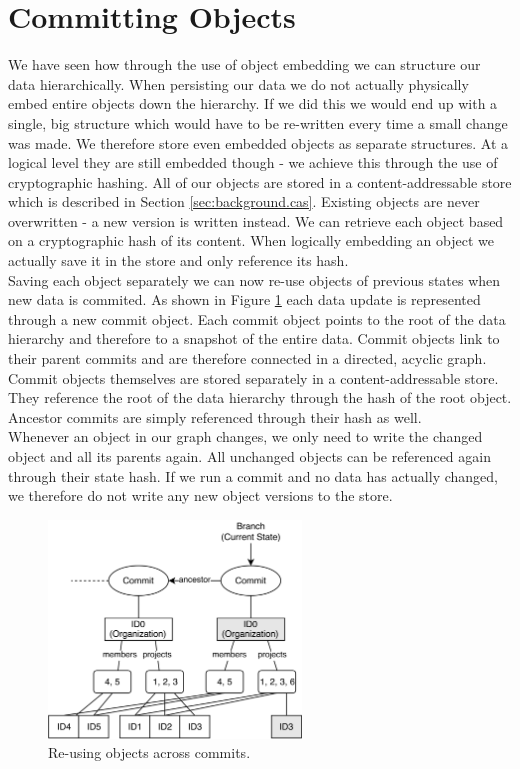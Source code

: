 
\section{Committing Objects}
\label{sec:histo.committing}
We have seen how through the use of object embedding we can structure our data hierarchically.
When persisting our data we do not actually physically embed entire objects down the hierarchy.
If we did this we would end up with a single, big structure which would have to be re-written every time a small change was made.
We therefore store even embedded objects as separate structures.
At a logical level they are still embedded though - we achieve this through the use of cryptographic hashing.
All of our objects are stored in a content-addressable store which is described in Section \ref{sec:background.cas}.
Existing objects are never overwritten - a new version is written instead.
We can retrieve each object based on a cryptographic hash of its content.
When logically embedding an object we actually save it in the store and only reference its hash.\\
Saving each object separately we can now re-use objects of previous states when new data is commited.
As shown in Figure \ref{fig:histo.commits} each data update is represented through a new commit object.
Each commit object points to the root of the data hierarchy and therefore to a snapshot of the entire data.
Commit objects link to their parent commits and are therefore connected in a directed, acyclic graph.\\
Commit objects themselves are stored separately in a content-addressable store.
They reference the root of the data hierarchy through the hash of the root object.
Ancestor commits are simply referenced through their hash as well.\\
Whenever an object in our graph changes, we only need to write the changed object and all its parents again.
All unchanged objects can be referenced again through their state hash.
If we run a commit and no data has actually changed, we therefore do not write any new object versions to the store.\\

\begin{figure}[H]
  \centering
  \includegraphics[width=0.6\textwidth]{img/commits}
  \caption{Re-using objects across commits.}
  \label{fig:histo.commits}
\end{figure}

